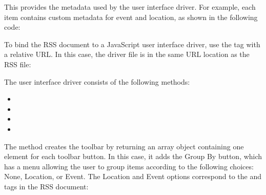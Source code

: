 \documentclass[letterpaper,12pt,english,openany,oneside]{sphinxmanual}
\begin{document}
This provides the metadata used by the user interface driver. For example, each item contains custom metadata for event and location, as shown in the following code:

\begin{sphinxVerbatim}[commandchars=\\\{\}]
 
 
\end{sphinxVerbatim}

To bind the RSS document to a JavaScript user interface driver, use the  tag with a relative URL. In this case, the driver file is in the same URL location as the RSS file:

\begin{sphinxVerbatim}[commandchars=\\\{\}]
\end{sphinxVerbatim}

The user interface driver consists of the following methods:
\begin{itemize}
\item {} 

\item {} 

\item {} 

\item {} 

\end{itemize}

The  method creates the toolbar by returning an array object containing one element for each toolbar button. In this case, it adds the Group By button, which has a menu allowing the user to group items according to the following choices: None, Location, or Event. The Location and Event options correspond to the  and  tags in the RSS document:
\end{document}
